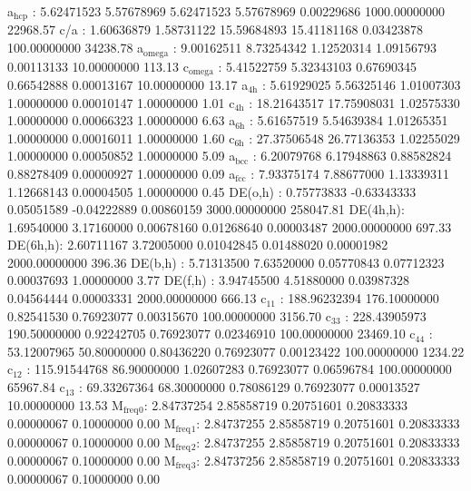\documentclass[11pt]{article}
\begin{document}
a\(_{\text{hcp}}\)   :   5.62471523   5.57678969   5.62471523   5.57678969   0.00229686 1000.00000000     22968.57
c/a     :   1.60636879   1.58731122  15.59684893  15.41181168   0.03423878 100.00000000     34238.78
a\(_{\text{omega}}\) :   9.00162511   8.73254342   1.12520314   1.09156793   0.00113133  10.00000000       113.13
c\(_{\text{omega}}\) :   5.41522759   5.32343103   0.67690345   0.66542888   0.00013167  10.00000000        13.17
a\(_{\text{4h}}\)    :   5.61929025   5.56325146   1.01007303   1.00000000   0.00010147   1.00000000         1.01
c\(_{\text{4h}}\)    :  18.21643517  17.75908031   1.02575330   1.00000000   0.00066323   1.00000000         6.63
a\(_{\text{6h}}\)    :   5.61657519   5.54639384   1.01265351   1.00000000   0.00016011   1.00000000         1.60
c\(_{\text{6h}}\)    :  27.37506548  26.77136353   1.02255029   1.00000000   0.00050852   1.00000000         5.09
a\(_{\text{bcc}}\)   :   6.20079768   6.17948863   0.88582824   0.88278409   0.00000927   1.00000000         0.09
a\(_{\text{fcc}}\)   :   7.93375174   7.88677000   1.13339311   1.12668143   0.00004505   1.00000000         0.45
DE(o,h) :   0.75773833  -0.63343333   0.05051589  -0.04222889   0.00860159 3000.00000000    258047.81
DE(4h,h):   1.69540000   3.17160000   0.00678160   0.01268640   0.00003487 2000.00000000       697.33
DE(6h,h):   2.60711167   3.72005000   0.01042845   0.01488020   0.00001982 2000.00000000       396.36
DE(b,h) :   5.71313500   7.63520000   0.05770843   0.07712323   0.00037693   1.00000000         3.77
DE(f,h) :   3.94745500   4.51880000   0.03987328   0.04564444   0.00003331 2000.00000000       666.13
c\(_{\text{11}}\)    : 188.96232394 176.10000000   0.82541530   0.76923077   0.00315670 100.00000000      3156.70
c\(_{\text{33}}\)    : 228.43905973 190.50000000   0.92242705   0.76923077   0.02346910 100.00000000     23469.10
c\(_{\text{44}}\)    :  53.12007965  50.80000000   0.80436220   0.76923077   0.00123422 100.00000000      1234.22
c\(_{\text{12}}\)    : 115.91544768  86.90000000   1.02607283   0.76923077   0.06596784 100.00000000     65967.84
c\(_{\text{13}}\)    :  69.33267364  68.30000000   0.78086129   0.76923077   0.00013527  10.00000000        13.53
M\(_{\text{freq}}\)\(_{\text{0}}\):   2.84737254   2.85858719   0.20751601   0.20833333   0.00000067   0.10000000         0.00
M\(_{\text{freq}}\)\(_{\text{1}}\):   2.84737255   2.85858719   0.20751601   0.20833333   0.00000067   0.10000000         0.00
M\(_{\text{freq}}\)\(_{\text{2}}\):   2.84737255   2.85858719   0.20751601   0.20833333   0.00000067   0.10000000         0.00
M\(_{\text{freq}}\)\(_{\text{3}}\):   2.84737256   2.85858719   0.20751601   0.20833333   0.00000067   0.10000000         0.00
\end{document}
